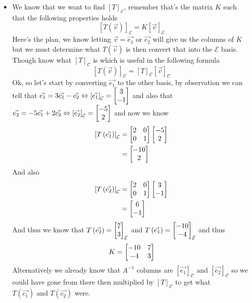 \documentclass[11pt]{book}
\begin{document}
\begin{itemize}
    \item We know that we want to find $\left[ T \right]_{\mathcal{E}} $, remember that's the matrix $K$ such that the following properties holds 
        \[
        \left[ T\left(\vec{v} \right) \right]_{\mathcal{E}} = K\left[ \vec{v}  \right]_{\mathcal{E}} 
        \]
        Here's the plan, we know letting $\vec{v} = \vec{e_1} \text{ or } \vec{e_2} $ will give us the columns of $K$ but we must determine what $T\left(\vec{v} \right)$ is then convert that into the $\mathcal{E} $ basis. Though know what $\left[ T \right]_{\mathcal{C}} $ is which is useful in the following formula
        \begin{equation*}
            \left[ T\left(\vec{v} \right) \right]_{\mathcal{C}} = \left[ T \right]_{\mathcal{C}} \left[ \vec{v}  \right]_{\mathcal{C}} 
        \end{equation*}
    Ok, so let's start by converting $\vec{e_1} $ to the other basis, by observation we can tell that $\vec{e_1} = 3\vec{c_1}  - \vec{c_2} \Leftrightarrow \left[ \vec{e_1}  \right]_{\mathcal{C}} = \begin{bmatrix} 3 \\ -1 \end{bmatrix} $ and also that $\vec{e_2} = -5\vec{c_1}  + 2\vec{c_2} \Leftrightarrow \left[ \vec{e_2}  \right]_{\mathcal{C}} = \begin{bmatrix} -5 \\ 2 \end{bmatrix} $ and now we know 
    \begin{align*}
        \left[ T\left(\vec{e_1} \right) \right]_{\mathcal{C}} &= \begin{bmatrix} 2 & 0 \\ 0 & 1 \end{bmatrix}\begin{bmatrix} -5 \\ 2 \end{bmatrix}  \\
        &= \begin{bmatrix} -10 \\ 2 \end{bmatrix}
    \end{align*}
    And also 
    \begin{align*}
        \left[ T\left(\vec{e_2} \right) \right]_{\mathcal{C}} &= \begin{bmatrix} 2 & 0 \\ 0 & 1 \end{bmatrix} \begin{bmatrix} 3 \\ -1 \end{bmatrix} \\
        &= \begin{bmatrix} 6 \\ -1 \end{bmatrix}
    \end{align*}
    And thus we know that $T\left(\vec{e_2} \right)= \begin{bmatrix} 7 \\ 3 \end{bmatrix} _{\mathcal{E} } $ and $T\left(\vec{e_1} \right) = \begin{bmatrix} -10 \\ -4 \end{bmatrix} _{\mathcal{E} } $ and thus 
    \[
    K= \begin{bmatrix} -10 & 7 \\ -4 & 3 \end{bmatrix}
    \]
    Alternatively we already know that $A^{-1} $ columns are $\left[ \vec{e_1}  \right]_{\mathcal{C}} \text{ and } \left[ \vec{e_2}  \right]_{\mathcal{C}} $ so we could have gone from there then multiplied by $\left[ T \right]_{\mathcal{C}} $ to get what $T\left(\vec{c_1} \right) \text{ and } T\left(\vec{c_2} \right)$ were.
\end{itemize}
\end{document}
